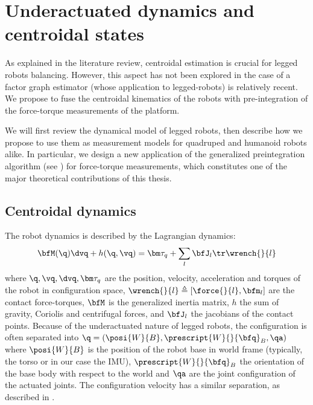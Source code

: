 \chapter{Underactuated dynamics and centroidal states}
\label{chp:underactuade_dynamics}
\minitoc
\bigskip


As explained in the literature review, centroidal estimation is crucial for legged robots balancing. However, this aspect has not been explored in the case of a factor graph 
estimator (whose application to legged-robots) is relatively recent. We propose to fuse the centroidal kinematics of the robots with pre-integration of the force-torque measurements 
of the platform.

We will first review the dynamical model of legged robots, then describe how we propose to use them as measurement models for quadruped and humanoid robots alike.
In particular, we design a new application of the generalized preintegration algorithm (see ) for force-torque measurements, which constitutes
one of the major theoretical contributions of this thesis.


\section{Centroidal dynamics}
\label{sec:centroidal_dynamics}
The robot dynamics is described by the Lagrangian dynamics:
%
\begin{equation}\label{eq:wbdyn}
  \bfM(\q) \dvq + h(\q,\vq) = \bm\tau_q + \sum_l \bfJ_l\tr \wrench{}{l}
\end{equation}
%
where $\q,\vq,\dvq,\bm\tau_q$ are the position, velocity, acceleration and torques of the robot in configuration space,
$\wrench{}{l} \triangleq [\force{}{l},\bfm_l]$ are the contact force-torques,
$\bfM$ is the generalized inertia matrix, $h$ the sum of gravity, Coriolis and centrifugal forces, and $\bfJ_l$ the jacobians of the contact points.
Because of the underactuated nature of legged robots, the configuration is often separated into $\q=(\posi{W}{B}, \prescript{W}{}{\bfq}_B ,\qa)$ where $\posi{W}{B}$ 
is the position of the robot base in world frame (typically, the torso or in our case the IMU), $\prescript{W}{}{\bfq}_B$ the orientation of the base body with respect 
to the world and $\qa$ are the joint configuration of the actuated joints. The configuration velocity has a similar separation, as described in .

